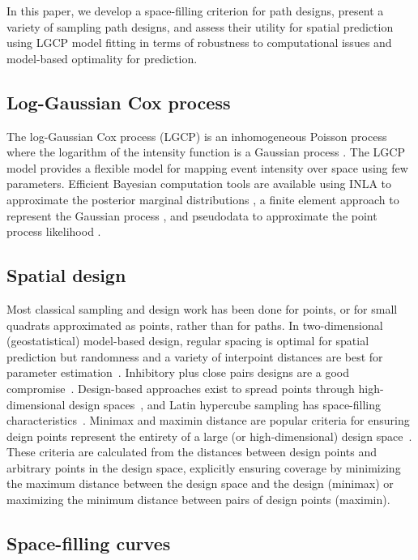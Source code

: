 \documentclass[review]{elsarticle}
\begin{document}
In this paper, we develop a space-filling criterion for path designs, present
a variety of sampling path designs, and assess their utility for spatial
prediction using LGCP model fitting in terms of robustness to computational
issues and model-based optimality for prediction.


\subsection{Log-Gaussian Cox process}

The log-Gaussian Cox process (LGCP) is an inhomogeneous Poisson process where
the logarithm of the intensity function is a Gaussian process
\citep{moelleretal}. The LGCP model provides a flexible model for mapping event
intensity over space using few parameters. Efficient Bayesian computation tools
are available using INLA to approximate the posterior marginal distributions
\citep{rueetal}, a finite element approach to represent the Gaussian process
\citep{lindgrenetal}, and pseudodata to approximate the point process
likelihood \citep{simpsonetal}.


\subsection{Spatial design}

Most classical sampling and design work has been done for points, or for small
quadrats approximated as points, rather than for paths. In two-dimensional
(geostatistical) model-based design, regular spacing is optimal for spatial
prediction but randomness and a variety of interpoint distances are best for
parameter estimation~\citep{diggle}. Inhibitory plus close pairs designs are a
good compromise~\citep{chipetaetal2017}. Design-based approaches exist to
spread points through high-dimensional design spaces~\citep{borkowskipiepel},
and Latin hypercube sampling has space-filling
characteristics~\citep{mckayetal,husslageetal}. Minimax and maximin distance
are popular criteria for ensuring deign points represent the entirety of a
large (or high-dimensional) design space~\citep{johnson}. These criteria
are calculated from the distances between design points and arbitrary
points in the design space, explicitly ensuring coverage by minimizing the
maximum distance between the design space and the design (minimax) or
maximizing the minimum distance between pairs of design points (maximin).


\subsection{Space-filling curves}
\end{document}
